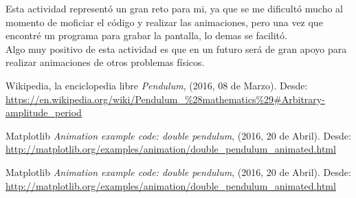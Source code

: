 \documentclass[12pt,letterpaper]{article}
\begin{document}
Esta actividad representó un gran reto para mi, ya que se me dificultó mucho al momento de moficiar el código y realizar las animaciones, pero una vez que encontré un programa para grabar la pantalla, lo demas se facilitó.\\
Algo muy positivo de esta actividad es que en un futuro será de gran apoyo para realizar animaciones de otros problemas físicos.


\begin{thebibliography}{widestlabel}

 Wikipedia, la enciclopedia libre \emph{Pendulum}, (2016, 08 de Marzo). Desde: \url{https://en.wikipedia.org/wiki/Pendulum_\%28mathematics\%29#Arbitrary-amplitude_period}

 Matplotlib \emph{Animation example code: double pendulum}, (2016, 20 de Abril). Desde: \url{http://matplotlib.org/examples/animation/double_pendulum_animated.html}

 Matplotlib \emph{Animation example code: double pendulum}, (2016, 20 de Abril). Desde: \url{http://matplotlib.org/examples/animation/double_pendulum_animated.html}

\end{thebibliography}
\end{document}
